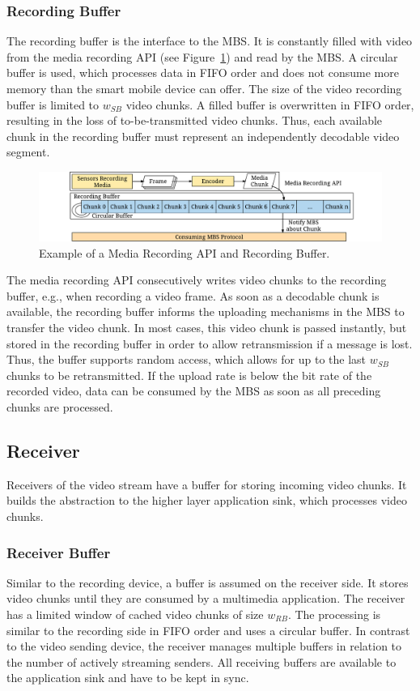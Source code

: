 \subsubsection{Recording Buffer}
The recording buffer is the interface to the \ac{MBS}.
It is constantly filled with video from the media recording \ac{API} (see Figure~\ref{fig:520_videorecordingapi}) and read by the \ac{MBS}.
A circular buffer is used, which processes data in \ac{FIFO} order and does not consume more memory than the smart mobile device can offer.
The size of the video recording buffer is limited to $w_{SB}$ video chunks.
A filled buffer is overwritten in \ac{FIFO} order, resulting in the loss of to-be-transmitted video chunks.
Thus, each available chunk in the recording buffer must represent an independently decodable video segment.
\begin{figure}
\centering
\includegraphics[width=\linewidth]{gfx/500_MobileUpload/MediaRecordingAPI}
\caption{Example of a Media Recording API and Recording Buffer.}
\label{fig:520_videorecordingapi}
\end{figure}

The media recording \ac{API} consecutively writes video chunks to the recording buffer, e.g., when recording a video frame.
As soon as a decodable chunk is available, the recording buffer informs the uploading mechanisms in the \ac{MBS} to transfer the video chunk. 
In most cases, this video chunk is passed instantly, but stored in the recording buffer in order to allow retransmission if a message is lost.
Thus, the buffer supports random access, which allows for up to the last $w_{SB}$ chunks to be retransmitted.
If the upload rate is below the bit rate of the recorded video, data can be consumed by the \ac{MBS} as soon as all preceding chunks are processed.
\subsection{Receiver}
Receivers of the video stream have a buffer for storing incoming video chunks.
It builds the abstraction to the higher layer application sink, which processes video chunks.
\subsubsection{Receiver Buffer}
Similar to the recording device, a buffer is assumed on the receiver side.
It stores video chunks until they are consumed by a multimedia application.
The receiver has a limited window of cached video chunks of size $w_{RB}$.
The processing is similar to the recording side in \ac{FIFO} order and uses a circular buffer.
In contrast to the video sending device, the receiver manages multiple buffers in relation to the number of actively streaming senders. 
All receiving buffers are available to the application sink and have to be kept in sync.

